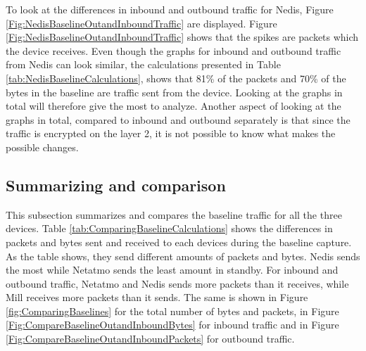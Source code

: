 To look at the differences in inbound and outbound traffic for Nedis, Figure \ref{Fig:NedisBaselineOutandInboundTraffic} are displayed. Figure \ref{Fig:NedisBaselineOutandInboundTraffic} shows that the spikes are packets which the device receives. Even though the graphs for inbound and outbound traffic from Nedis can look similar, the calculations presented in Table \ref{tab:NedisBaselineCalculations}, shows that 81\% of the packets and 70\% of the bytes in the baseline are traffic sent from the device. Looking at the graphs in total will therefore give the most to analyze. Another aspect of looking at the graphs in total, compared to inbound and outbound separately is that since the traffic is encrypted on the layer 2, it is not possible to know what makes the possible changes. 

\subsection{Summarizing and comparison}
This subsection summarizes and compares the baseline traffic for all the three devices. Table \ref{tab:ComparingBaselineCalculations} shows the differences in packets and bytes sent and received to each devices during the baseline capture. As the table shows, they send different amounts of packets and bytes. Nedis sends the most while Netatmo sends the least amount in standby. For inbound and outbound traffic, Netatmo and Nedis sends more packets than it receives, while Mill receives more packets than it sends. The same is shown in Figure \ref{fig:ComparingBaselines} for the total number of bytes and packets, in Figure \ref{Fig:CompareBaselineOutandInboundBytes} for inbound traffic and in Figure \ref{Fig:CompareBaselineOutandInboundPackets} for outbound traffic.

